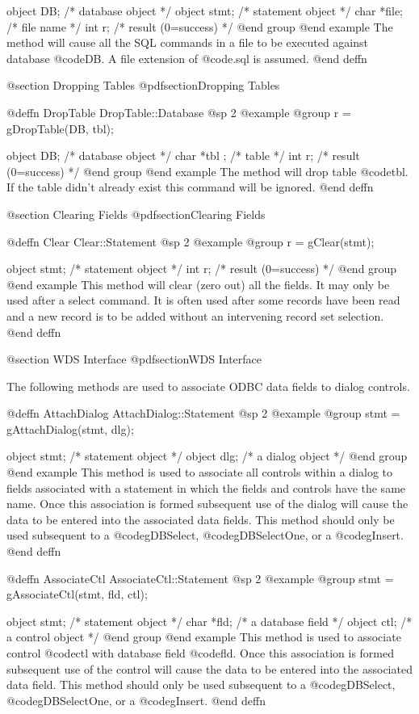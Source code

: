 object  DB;     /*  database object    */
object  stmt;   /*  statement object   */
char    *file;  /*  file name          */
int     r;      /*  result (0=success) */
@end group
@end example
The method will cause all the SQL commands in a file to be executed against database @code{DB}.
A file extension of @code{.sql} is assumed.
@end deffn


@section Dropping Tables
@pdfsection{Dropping Tables}



@deffn {DropTable}  DropTable::Database
@sp 2
@example
@group
r = gDropTable(DB, tbl);

object  DB;     /*  database object    */
char    *tbl ;  /*  table              */
int     r;      /*  result (0=success) */
@end group
@end example
The method will drop table @code{tbl}.  If the table didn't already
exist this command will be ignored.
@end deffn



@section Clearing Fields
@pdfsection{Clearing Fields}


@deffn {Clear}  Clear::Statement
@sp 2
@example
@group
r = gClear(stmt);

object  stmt;   /*  statement object   */
int     r;      /*  result (0=success) */
@end group
@end example
This method will clear (zero out) all the fields.  It may only be used
after a select command.  It is often used after some records have been
read and a new record is to be added without an intervening record set
selection.
@end deffn


@section WDS Interface
@pdfsection{WDS Interface}

The following methods are used to associate ODBC data fields to dialog controls.


@deffn {AttachDialog}  AttachDialog::Statement
@sp 2
@example
@group
stmt = gAttachDialog(stmt, dlg);

object  stmt;   /*  statement object   */
object  dlg;    /*  a dialog object    */
@end group
@end example
This method is used to associate all controls within a dialog to fields
associated with a statement in which the fields and controls have the
same name.  Once this association is formed subsequent use of the dialog
will cause the data to be entered into the associated data fields.
This method should only be used subsequent to a @code{gDBSelect}, @code{gDBSelectOne}, or
a @code{gInsert}.
@end deffn


@deffn {AssociateCtl}  AssociateCtl::Statement
@sp 2
@example
@group
stmt = gAssociateCtl(stmt, fld, ctl);

object  stmt;   /*  statement object   */
char    *fld;   /*  a database field   */
object  ctl;    /*  a control object   */
@end group
@end example
This method is used to associate control @code{ctl} with database field @code{fld}.
Once this association is formed subsequent use of the control
will cause the data to be entered into the associated data field.
This method should only be used subsequent to a @code{gDBSelect}, @code{gDBSelectOne}, or
a @code{gInsert}.
@end deffn

